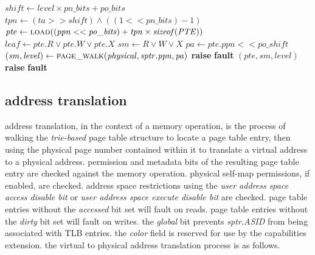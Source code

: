 \begin{algorithm}[H]
\footnotesize
\caption{find page table entry for translation address}
\begin{algorithmic}[1]
    \State $\mathit{shift} \gets \mathit{level} \times
      \mathit{pn\_bits} + \mathit{po\_bits}$
    \State $\mathit{tpn} \gets (\mathit{ta} >> \mathit{shift}) \land
      ((1 << \mathit{pn\_bits}) - 1)$
    \State $\mathit{pte} \gets \Call{load}{(\mathit{ppn}
      << \mathit{po\_bits}) + \mathit{tpn} \times \mathit{sizeof(PTE)}}$
    \State $\mathit{leaf} \gets
      \mathit{pte.R} \lor \mathit{pte.W} \lor \mathit{pte.X}$
    \State $\mathit{sm} \gets
      \mathit{R} \lor \mathit{W} \lor \mathit{X}$
      \State $\mathit{pa} \gets \mathit{pte.ppn} << \mathit{po\_shift}$
      \State $(\mathit{sm},\mathit{level}) \gets \Call{page\_walk}{%
        \mathit{physical},\mathit{sptr.ppn},\mathit{pa}}$
        \State \textbf{raise} \textbf{fault}
      \EndIf
    \EndIf
      \State \Return $(\mathit{pte}, \mathit{sm}, \mathit{level})$
      \State \textbf{raise} \textbf{fault}
    \EndIf
  \EndFor
\EndFunction
\end{algorithmic}
\end{algorithm}

\newpage
\subsection{address translation}

address translation, in the context of a memory operation, is the process of
walking the \emph{trie-based} page table structure to locate a page table
entry, then using the physical page number contained within it to translate
a virtual address to a physical address. permission and metadata bits
of the resulting page table entry are checked against the memory operation.
physical self-map permissions, if enabled, are checked. address space
restrictions using the \emph{user address space access disable bit} or
\emph{user address space execute disable bit} are checked.
\para
page table entries without the \emph{accessed} bit set will fault on reads.
page table entries without the \emph{dirty} bit set will fault on writes.
the \emph{global} bit prevents \emph{sptr.ASID} from being associated with
TLB entries.
the \emph{color} field is reserved for use by the capabilities extension.
\para
the virtual to physical address translation process is as follows.

